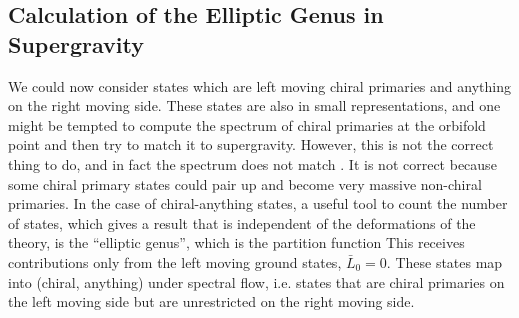 \subsection{Calculation of the Elliptic Genus in Supergravity}

We could now consider states which are left moving chiral 
primaries and anything on the right moving side. 
These states are also in small representations, and 
one might be tempted to compute the spectrum of chiral 
primaries at the orbifold point and then try to match it 
to supergravity. However,
this is not the correct thing to do, and in fact 
the spectrum does not match \cite{Vafa:1998nt}. 
It is not correct because some chiral primary
states could pair up and become very massive 
 non-chiral primaries.
In the case of chiral-anything states, a useful tool to 
count the number of states, which gives a result that is independent
of the deformations of the theory, is the ``elliptic genus'',
which is the partition function 
This receives contributions only from the left  moving ground states,
$\bar L_0 = 0$. These states map into (chiral, anything) under
spectral flow, i.e. states that are chiral primaries on the left moving 
side but are unrestricted on the right moving side.

